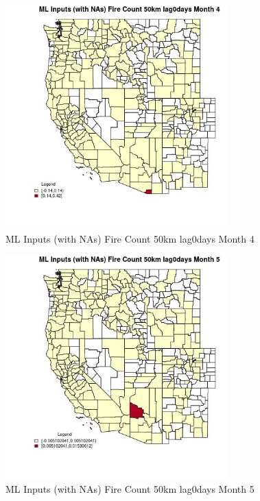 \begin{figure} 
\centering  
\includegraphics[width=0.77\textwidth]{Code_Outputs/Report_ML_input_PM25_Step4_part_e_de_duplicated_aves_compiled_2019-05-20wNAs_CountyFire_Count_50km_lag0daysmedianMonth4.jpg} 
\caption{\label{fig:Report_ML_input_PM25_Step4_part_e_de_duplicated_aves_compiled_2019-05-20wNAsCountyFire_Count_50km_lag0daysmedianMonth4}ML Inputs (with NAs) Fire Count 50km lag0days Month 4} 
\end{figure} 
 

\begin{figure} 
\centering  
\includegraphics[width=0.77\textwidth]{Code_Outputs/Report_ML_input_PM25_Step4_part_e_de_duplicated_aves_compiled_2019-05-20wNAs_CountyFire_Count_50km_lag0daysmedianMonth5.jpg} 
\caption{\label{fig:Report_ML_input_PM25_Step4_part_e_de_duplicated_aves_compiled_2019-05-20wNAsCountyFire_Count_50km_lag0daysmedianMonth5}ML Inputs (with NAs) Fire Count 50km lag0days Month 5} 
\end{figure} 
 

